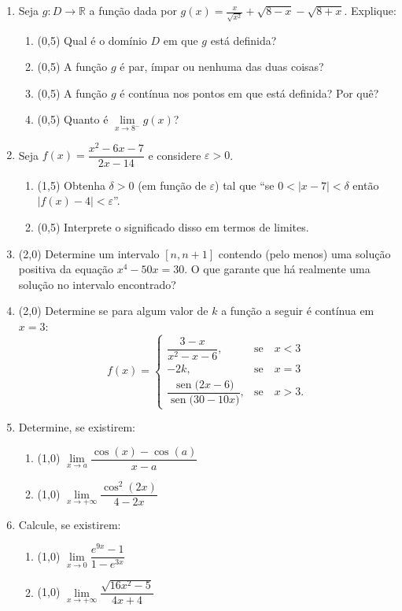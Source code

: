 \documentclass[12pt,a4paper]{article}
\newcommand*\sen[1]{\operatorname{sen}{#1}}
\begin{document}
\begin{enumerate}
\item Seja $g: D \to \mathbb{R}$ a função dada por $g(x) = \frac{x}{\sqrt{x^2}} + \sqrt{8 - x} - \sqrt{8 + x}$. Explique:
\begin{enumerate}
\item (0,5) Qual é o domínio $D$ em que $g$ está definida?
\item (0,5) A função $g$ é par, ímpar ou nenhuma das duas coisas?
\item (0,5) A função $g$ é contínua nos pontos em que está definida? Por quê?
\item (0,5) Quanto é $\lim\limits_{x\to 8^-} g(x)$?
\end{enumerate}

\item Seja $f(x) = \dfrac{x^2 - 6x - 7}{2x - 14}$ e considere $\varepsilon > 0$.
\begin{enumerate}
\item (1,5) Obtenha $\delta > 0$ (em função de $\varepsilon$) tal que ``se $0 < |x - 7| < \delta$ então $|f(x) - 4| < \varepsilon$''.
\item (0,5) Interprete o significado disso em termos de limites.
\end{enumerate}

\item (2,0) Determine um intervalo $[n, n+1]$ contendo (pelo menos) uma solução positiva da equação $x^4 - 50x = 30$. O que garante que há realmente uma solução no intervalo encontrado?

\item (2,0) Determine se para algum valor de $k$ a função a seguir é contínua em $x = 3$:
\[f(x)=\left\{\begin{array}{ll}
\dfrac{3-x}{x^2-x-6}, & \text{se}\quad x<3\\
-2 k, & \text{se}\quad x = 3 \\
\dfrac{\sen(2x - 6)}{\sen(30 - 10x)}, & \text{se}\quad x > 3.
\end{array}\right.
\]

\item Determine, se existirem:
\begin{enumerate}
\item (1,0) $\lim\limits_{x\to a} \dfrac{\cos(x)-\cos(a)}{x-a}$
\item (1,0) $\lim\limits_{x\to +\infty} \dfrac{\cos^2(2x)}{4-2x}$
\end{enumerate}

\item Calcule, se existirem:
\begin{enumerate}
\item (1,0) $\lim\limits_{x\to 0} \dfrac{e^{9x}-1}{1-e^{3x}} $
\item (1,0) $\lim\limits_{x\to +\infty} \dfrac{\sqrt{16x^2-5}}{4x+4}$
\end{enumerate}
\end{enumerate}
\end{document}

